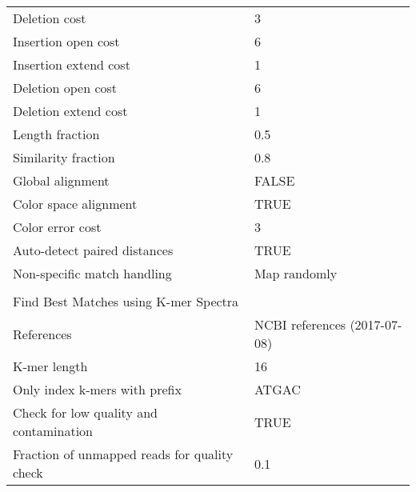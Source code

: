 \begin{longtable}{ll}
Deletion cost                                & 3                                              \\
Insertion open cost                          & 6                                              \\
Insertion extend cost                        & 1                                              \\
Deletion open cost                           & 6                                              \\
Deletion extend cost                         & 1                                              \\
Length fraction                              & 0.5                                            \\
Similarity fraction                          & 0.8                                            \\
Global alignment                             & FALSE                                          \\
Color space alignment                        & TRUE                                           \\
Color error cost                             & 3                                              \\
Auto-detect paired distances                 & TRUE                                           \\
Non-specific match handling                  & Map randomly                                   \\
                                             &                                                \\
\multicolumn{2}{l}{Find Best Matches using K-mer Spectra}                                     \\
References                                   & NCBI references (2017-07-08)                   \\
K-mer length                                 & 16                                             \\
Only index k-mers with prefix                & ATGAC                                          \\
Check for low quality and contamination      & TRUE                                           \\
Fraction of unmapped reads for quality check & 0.1                                            \\

\end{longtable}
